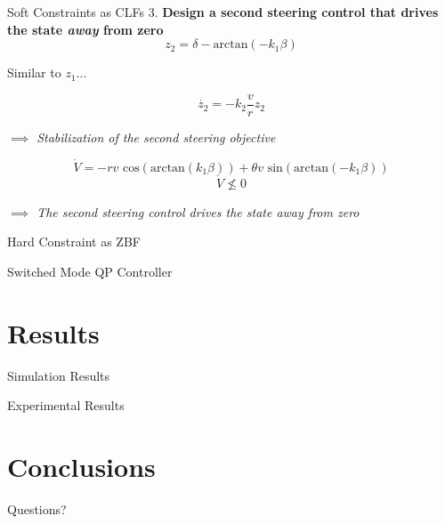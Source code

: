 \documentclass[10pt]{beamer}
\begin{document}
\begin{frame}{Soft Constraints as CLFs}
3. \textbf{Design a second steering control that drives the state \textit{away} from zero}
$$z_2 = \delta - \text{arctan}(-k_1\beta)$$\pause

\begin{center}
Similar to $z_1$... \pause
\end{center}

$$ \dot{z_2}=-k_2\frac{v}{r}z_2 $$
\begin{center}\textit{$\implies$ Stabilization of the second steering objective}\end{center}\pause

$$\dot{V}=-r v \text{ cos}(\text{arctan}(k_1\beta)) + \theta v \text{ sin}(\text{arctan}(-k_1\beta))$$\pause
$$\dot{V}\nleq 0$$\begin{center}
\textit{$\implies$ The second steering control drives the state \alert{away} from zero}\end{center}

\end{frame}
%
%


\begin{frame}{Hard Constraint as ZBF}

\end{frame}

\begin{frame}{Switched Mode QP Controller}

\end{frame}

\section{Results}
\begin{frame}{Simulation Results}

\end{frame}

\begin{frame}{Experimental Results}

\end{frame}

\section{Conclusions}
\begin{frame}{}

\end{frame}


\begin{frame}[standout]
Questions?
\end{frame}
\end{document}
